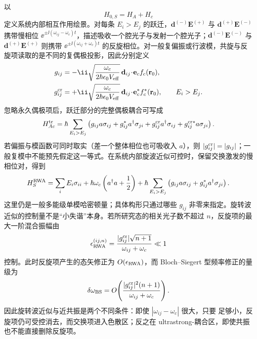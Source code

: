 以
\[
H_{0,S}=H_A+H_c
\]
定义系统内部相互作用绘景。对每条 $E_i>E_j$ 的跃迁，$\mathbf d^{(-)}\mathbf E^{(+)}$ 与 $\mathbf d^{(+)}\mathbf E^{(-)}$ 携带慢相位 $\ee^{\pm\ii(\omega_{ij}-\omega_c)t}$，描述吸收一个腔光子与发射一个腔光子；$\mathbf d^{(-)}\mathbf E^{(-)}$ 与 $\mathbf d^{(+)}\mathbf E^{(+)}$ 则携带 $\ee^{\pm\ii(\omega_{ij}+\omega_c)t}$ 的反旋相位。对一般复偏振或行波模，共旋与反旋项读取的是不同的复偶极投影，因此分别定义
\begin{equation}
\begin{aligned}
 g_{ij}
 &=-\ii\sqrt{\frac{\omega_c}{2\hbar\epsilon_0V_{\rm eff}}}
 \,\mathbf d_{ij}\!\cdot\!\mathbf e_c f_c(\mathbf r_0),\\
 g_{ij}^{\rm cr}
 &=+\ii\sqrt{\frac{\omega_c}{2\hbar\epsilon_0V_{\rm eff}}}
 \,\mathbf d_{ij}\!\cdot\!\mathbf e_c^* f_c^*(\mathbf r_0),
 \qquad E_i>E_j.
\end{aligned}
\label{eq:phys-oqs-gij-def}
\end{equation}
忽略永久偶极项后，跃迁部分的完整偶极耦合可写成
\begin{equation}
H_{Ac}^{\rm tr}
=\hbar\sum_{E_i>E_j}
\left(
 g_{ij}a\sigma_{ij}+g_{ij}^*a^\dagger\sigma_{ji}
 +g_{ij}^{\rm cr}a^\dagger\sigma_{ij}
 +g_{ij}^{{\rm cr}*}a\sigma_{ji}
\right).
\label{eq:phys-oqs-cavity-rot-counter-coupling}
\end{equation}
若偏振与模函数可同时取实（差一个整体相位也可吸收入 $a$），则 $|g_{ij}^{\rm cr}|=|g_{ij}|$；一般复模中不能预先假定这一等式。在系统内部旋波近似可控时，保留交换激发的慢相位对，得到
\begin{equation}
H_S^{\rm RWA}
=\sum_iE_i\sigma_{ii}
+\hbar\omega_c\left(a^\dagger a+\frac12\right)
+\hbar\sum_{E_i>E_j}
\left(g_{ij}a\sigma_{ij}+g_{ij}^*a^\dagger\sigma_{ji}\right).
\label{eq:phys-oqs-hs-rwa}
\end{equation}
这里仍是一般多能级单模哈密顿量；具体构形只通过哪些 $g_{ij}$ 非零来指定。旋转波近似的控制量不是“小失谐”本身。若所研究态的相关光子数不超过 $n$，反旋项的最大一阶混合振幅由
\begin{equation}
\epsilon_{\rm RWA}^{(ij,n)}
=\frac{|g_{ij}^{\rm cr}|\sqrt{n+1}}{\omega_{ij}+\omega_c}
\ll1
\label{eq:phys-oqs-rwa-small-parameter}
\end{equation}
控制。此时反旋项产生的态矢修正为 $O(\epsilon_{\rm RWA})$，而 Bloch--Siegert 型频率修正的量级为
\[
\delta\omega_{\rm BS}
=O\!\left(\frac{|g_{ij}^{\rm cr}|^2(n+1)}{\omega_{ij}+\omega_c}\right).
\]
因此旋转波近似与近共振是两个不同条件：即使 $|\omega_{ij}-\omega_c|$ 很大，只要 足够小，反旋项仍可受控消去，而交换项进入色散区；反之在 ultrastrong-耦合区，即使共振也不能直接删除反旋项。

